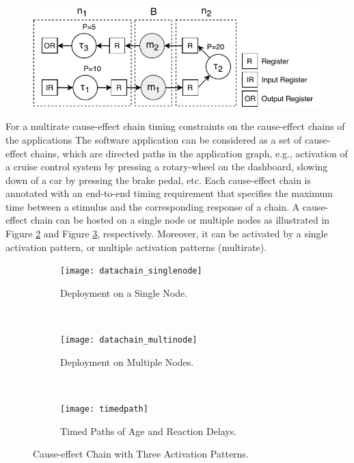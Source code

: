 \begin{figure}
	\centering
	\includegraphics[width=0.5\linewidth]{img/cause_effect_chain_ntk}
	\caption[A cause-effect chain deployed on node 1 and node2.]{}
	\label{fig:causeeffectchainntk}
\end{figure}


For a multirate cause-effect chain   timing constraints on the cause-effect chains of the applications
The software application can be considered as a set of cause-effect chains, which are directed paths in the application graph, e.g.,  activation of a cruise control system by pressing a rotary-wheel on the dashboard, slowing down of a car by pressing the brake pedal, etc. Each cause-effect chain is annotated with an end-to-end timing requirement that specifies the maximum time between a stimulus and the corresponding response of a chain. A cause-effect chain can be hosted on a single node or multiple nodes as illustrated in Figure \ref{fig_datachainsingle} and Figure \ref{fig_datachainmulti}, respectively. Moreover, it can be activated by a single activation pattern, or multiple activation patterns (multirate).
\begin{figure}[h!]
    \centering
    \begin{subfigure}[b]{0.25\textwidth}
    \texttt{[image: datachain\_singlenode]}
    \caption{Deployment on a Single Node.}
    \label{fig_datachainsingle}
    \end{subfigure}
    ~ %
    \begin{subfigure}[b]{0.365\textwidth}
    \texttt{[image: datachain\_multinode]}
    \caption{Deployment on Multiple Nodes.}
    \label{fig_datachainmulti}
    \end{subfigure}
   ~\vspace{-0.2cm}
    \begin{subfigure}[b]{0.35\textwidth}
    \texttt{[image: timedpath]}
    \caption{Timed Paths of Age and Reaction Delays.}
    \label{fig_timedpath}
    \end{subfigure}
    \caption{Cause-effect Chain with Three Activation Patterns.}
    \label{fig:datachain}
\end{figure}

